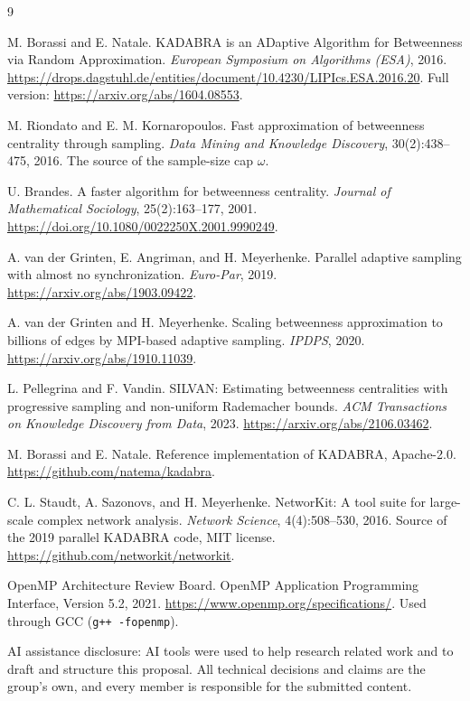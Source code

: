 \documentclass[11pt]{article}
\begin{document}
\begin{thebibliography}{9}

 M. Borassi and E. Natale. KADABRA is an ADaptive Algorithm for Betweenness via Random Approximation. \emph{European Symposium on Algorithms (ESA)}, 2016. \url{https://drops.dagstuhl.de/entities/document/10.4230/LIPIcs.ESA.2016.20}. Full version: \url{https://arxiv.org/abs/1604.08553}.

 M. Riondato and E. M. Kornaropoulos. Fast approximation of betweenness centrality through sampling. \emph{Data Mining and Knowledge Discovery}, 30(2):438--475, 2016. The source of the sample-size cap $\omega$.

 U. Brandes. A faster algorithm for betweenness centrality. \emph{Journal of Mathematical Sociology}, 25(2):163--177, 2001. \url{https://doi.org/10.1080/0022250X.2001.9990249}.

 A. van der Grinten, E. Angriman, and H. Meyerhenke. Parallel adaptive sampling with almost no synchronization. \emph{Euro-Par}, 2019. \url{https://arxiv.org/abs/1903.09422}.

 A. van der Grinten and H. Meyerhenke. Scaling betweenness approximation to billions of edges by MPI-based adaptive sampling. \emph{IPDPS}, 2020. \url{https://arxiv.org/abs/1910.11039}.

 L. Pellegrina and F. Vandin. SILVAN: Estimating betweenness centralities with progressive sampling and non-uniform Rademacher bounds. \emph{ACM Transactions on Knowledge Discovery from Data}, 2023. \url{https://arxiv.org/abs/2106.03462}.

 M. Borassi and E. Natale. Reference implementation of KADABRA, Apache-2.0. \url{https://github.com/natema/kadabra}.

 C. L. Staudt, A. Sazonovs, and H. Meyerhenke. NetworKit: A tool suite for large-scale complex network analysis. \emph{Network Science}, 4(4):508--530, 2016. Source of the 2019 parallel KADABRA code, MIT license. \url{https://github.com/networkit/networkit}.

 OpenMP Architecture Review Board. OpenMP Application Programming Interface, Version 5.2, 2021. \url{https://www.openmp.org/specifications/}. Used through GCC (\texttt{g++ -fopenmp}).

\end{thebibliography}

\vspace{1em}
\noindent\footnotesize{AI assistance disclosure: AI tools were used to help research related work and to draft and structure this proposal. All technical decisions and claims are the group's own, and every member is responsible for the submitted content.}
\end{document}
